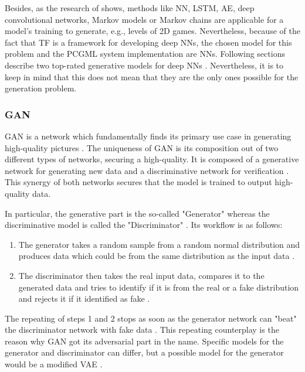 \documentclass[MGS,Master,english]{twbook}%
\begin{document}
Besides, as the research of \cite{pcgml::paper} shows, methods like \ac{NN}, \ac{LSTM}, \ac{AE}, deep convolutional networks, Markov models or Markov chains are applicable for a model's training to generate, e.g., levels of \ac{2D} games. Nevertheless, because of the fact that \ac{TF} is a framework for developing deep \acp{NN}, the chosen model for this problem and the PCGML system implementation are \acp{NN}. Following sections describe two top-rated generative models for deep \acp{NN} \cite{ml::vae::tutorial}. Nevertheless, it is to keep in mind that this does not mean that they are the only ones possible for the generation problem.

\subsubsection{\acl{GAN}}
\ac{GAN} is a network which fundamentally finds its primary use case in generating high-quality pictures \cite{ml::book::developer}. The uniqueness of \ac{GAN} is its composition out of two different types of networks, securing a high-quality. It is composed of a generative network for generating new data and a discriminative network for verification \cite{ml::book::developer}. This synergy of both networks secures that the model is trained to output high-quality data. 

In particular, the generative part is the so-called "Generator" whereas the discriminative model is called the "Discriminator" \cite{ml::book::developer}. Its workflow is as follows:
\begin{enumerate}
	\item The generator takes a random sample from a random normal distribution and produces data which could be from the same distribution as the input data \cite{ml::book::developer}.
	\item The discriminator then takes the real input data, compares it to the generated data and tries to identify if it is from the real or a fake distribution and rejects it if it identified as fake \cite{ml::book::developer}.
\end{enumerate} 

The repeating of steps 1 and 2 stops as soon as the generator network can "beat" the discriminator network with fake data \cite{ml::book::developer}. This repeating counterplay is the reason why GAN got its adversarial part in the name. Specific models for the generator and discriminator can differ, but a possible model for the generator would be a modified \ac{VAE} \cite{ml::book::nnProgrammingTF}.
\end{document}

